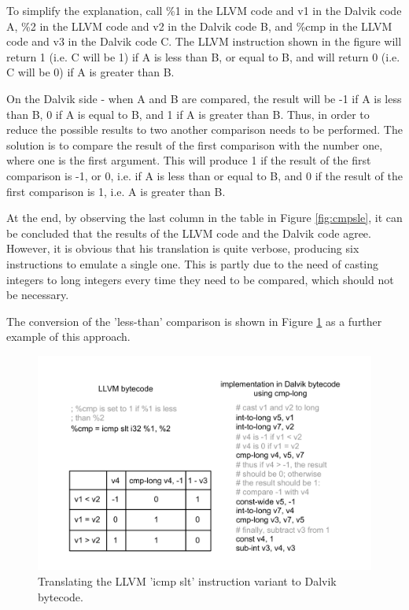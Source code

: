 \documentclass[parskip]{cs4rep}
\begin{document}
To simplify the explanation, call \%1 in the LLVM code and v1 in the Dalvik code A, \%2 in the LLVM code and v2 in the Dalvik code B, and \%cmp in the LLVM code and v3 in the Dalvik code C. The LLVM instruction shown in the figure will return 1 (i.e. C will be 1) if A is less than B, or equal to B, and will return 0 (i.e. C will be 0) if A is greater than B.

On the Dalvik side - when A and B are compared, the result will be -1 if A is less than B, 0 if A is equal to B, and 1 if A is greater than B. Thus, in order to reduce the possible results to two another comparison needs to be performed. The solution is to compare the result of the first comparison with the number one, where one is the first argument. This will produce 1 if the result of the first comparison is -1, or 0, i.e. if A is less than or equal to B, and 0 if the result of the first comparison is 1, i.e. A is greater than B.

At the end, by observing the last column in the table in Figure \ref{fig:cmpsle}, it can be concluded that the results of the LLVM code and the Dalvik code agree. However, it is obvious that his translation is quite verbose, producing six instructions to emulate a single one. This is partly due to the need of casting integers to long integers every time they need to be compared, which should not be necessary.

The conversion of the 'less-than' comparison is shown in Figure \ref{fig:cmpslt} as a further example of this approach.

\begin{figure}[h!]
    \centering
        \includegraphics[width=1.0\textwidth]{cmpslt}
    \caption{Translating the LLVM 'icmp slt' instruction variant to Dalvik bytecode.}
    \label{fig:cmpslt}
\end{figure}
\end{document}
